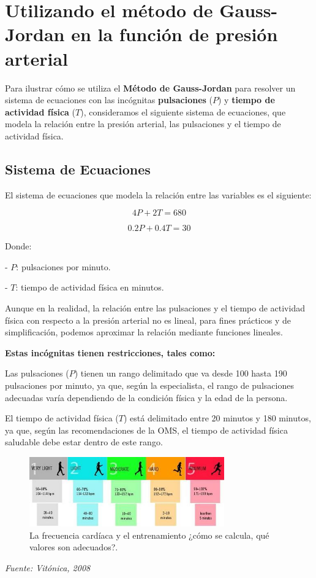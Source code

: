\documentclass[a4paper,10pt]{article}
\begin{document}
\section{Utilizando el método de Gauss-Jordan en la función de presión arterial}

Para ilustrar cómo se utiliza el \textbf{Método de Gauss-Jordan} para resolver un sistema de ecuaciones con las incógnitas \textbf{pulsaciones} (\(P\)) y \textbf{tiempo de actividad física} (\(T\)), consideramos el siguiente sistema de ecuaciones, que modela la relación entre la presión arterial, las pulsaciones y el tiempo de actividad física.



\subsection{Sistema de Ecuaciones}

El sistema de ecuaciones que modela la relación entre las variables es el siguiente:





\[
4P + 2T = 680
\]

\[
0.2P + 0.4T = 30
\]

Donde:

- \( P \): pulsaciones por minuto.

- \( T \): tiempo de actividad física en minutos.
\vspace{1em}

Aunque en la realidad, la relación entre las pulsaciones y el tiempo de actividad física con respecto a la presión arterial no es lineal, para fines prácticos y de simplificación, podemos aproximar la relación mediante funciones lineales.

\vspace{2em}
\textbf {Estas incógnitas tienen restricciones, tales como:} 

Las pulsaciones (\(P\)) tienen un rango delimitado que va desde 100 hasta 190 pulsaciones por minuto, ya que, según la especialista, el rango de pulsaciones adecuadas varía dependiendo de la condición física y la edad de la persona.

El tiempo de actividad física (\(T\)) está delimitado entre 20 minutos y 180 minutos, ya que, según las recomendaciones de la OMS, el tiempo de actividad física saludable debe estar dentro de este rango.

\vspace{1em}
\begin{figure}[H]
    \centering
    \includegraphics[width=0.75\textwidth]{1366_2000.jpg}
    \caption{La frecuencia cardíaca y el entrenamiento ¿cómo se calcula, qué valores son adecuados?.}
    \label{fig:presion}
\end{figure}
\textit{Fuente: Vitónica, 2008}
\vspace{2em}
\end{document}

